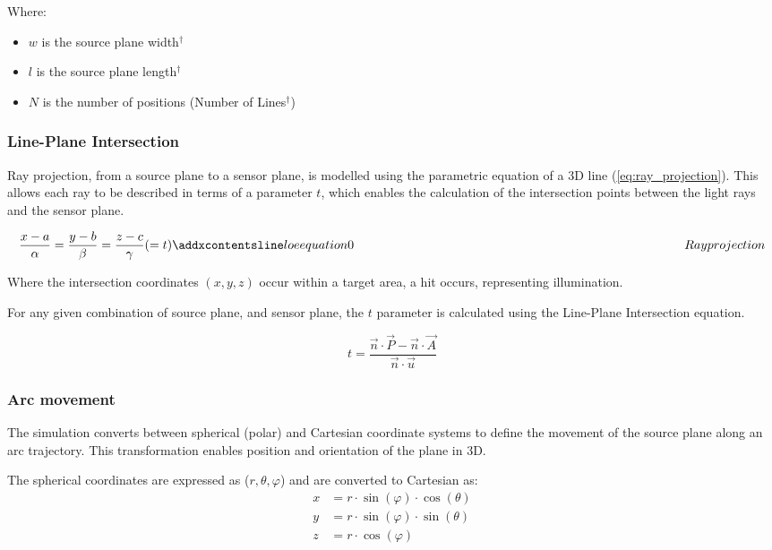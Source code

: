Where:
\begin{itemize}
    \item $w$ is the source plane width$^{\dagger}$
    \item $l$ is the source plane length$^{\dagger}$
    \item $N$ is the number of positions (Number of Lines$^{\dagger}$)
\end{itemize}


\subsubsection{Line-Plane Intersection}
Ray projection, from a source plane to a sensor plane, is modelled using the parametric equation of a 3D line (\ref{eq:ray_projection}). This allows each ray to be described in terms of a parameter $t$, which enables the calculation of the intersection points between the light rays and the sensor plane. 

\begin{equation}
\frac{x - a}{\alpha} = \frac{y - b}{\beta} = \frac{z - c}{\gamma} (=t)
\label{eq:ray_projection}
\addequation{Ray projection}
\end{equation}

Where the intersection coordinates $(x,y,z)$ occur within a target area, a hit occurs, representing illumination.

For any given combination of source plane, and sensor plane, the $t$ parameter is calculated using the Line-Plane Intersection equation.

\begin{equation}
    t = \frac{\vec{n} \cdot \vec{P} - \vec{n} \cdot \vec{A}}{\vec{n} \cdot \vec{u}}
    \label{eq:Line_Plane_Intersection}
\end{equation}

\subsubsection{Arc movement}
The simulation converts between spherical (polar) and Cartesian coordinate systems to define the movement of the source plane along an arc trajectory. This transformation enables position and orientation of the plane in 3D. 

The spherical coordinates are expressed as ($r, \theta, \varphi$) and are converted to Cartesian as:
\begin{align}
x &= r \cdot \sin(\varphi) \cdot \cos(\theta) \\
y &= r \cdot \sin(\varphi) \cdot \sin(\theta) \\
z &= r \cdot \cos(\varphi)
\end{align}

